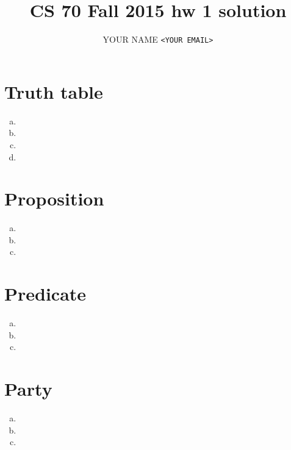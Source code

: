 \documentclass{article}
\newcommand{\myname}{YOUR NAME}
\newcommand{\myemail}{YOUR EMAIL}
\begin{document}
\setlength{\parindent}{0px}

\title{CS 70 Fall 2015 hw 1 solution}
\author{\myname{} \texttt{<\myemail>}}
\date{} %
\maketitle




\section{Truth table}
\begin{enumerate}[(a)]
    \item
    \item
    \item
    \item
\end{enumerate}




\section{Proposition}
\begin{enumerate}[(a)]
    \item
    \item
    \item
\end{enumerate}




\section{Predicate}
\begin{enumerate}[(a)]
    \item
    \item
    \item
\end{enumerate}




\section{Party}
\begin{enumerate}[(a)]
    \item
    \item
    \item
\end{enumerate}
\end{document}
